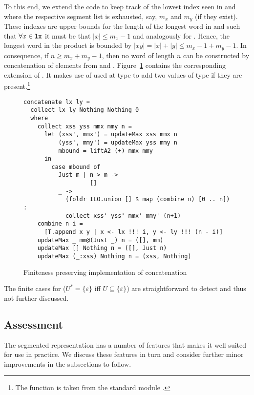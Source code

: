 To this end, we extend the code to keep track of the lowest index
seen in  and  where the respective segment list is
exhausted, say, $m_x$ and $m_y$ (if they exist). These indexes
are upper bounds for the length of the longest word in  and
 such that $\forall x \in \code{lx}$ it must be that
$|x|\le m_x-1$ and analogously for . Hence, the longest word in
the product is bounded by $|xy| = |x| + |y| \le m_x -1 + m_y -1$. In
consequence, if $n \ge m_x + m_y - 1$, then no word of
length $n$ can be constructed by concatenation of elements from
 and
. Figure~\ref{fig:finite-concatenation-segmented} contains
the corresponding extension of . It makes use of
 used at type  to add two values of type  if they are present.\footnote{The function  is taken from
the standard module .}
\begin{figure}[tp]
\begin{lstlisting}
concatenate lx ly =
  collect lx ly Nothing Nothing 0
  where
    collect xss yss mmx mmy n =
      let (xss', mmx') = updateMax xss mmx n
          (yss', mmy') = updateMax yss mmy n
          mbound = liftA2 (+) mmx mmy
      in
        case mbound of
          Just m | n > m ->
                   []
          _ ->
            (foldr ILO.union [] $ map (combine n) [0 .. n]) :
            collect xss' yss' mmx' mmy' (n+1)
    combine n i =
      [T.append x y | x <- lx !!! i, y <- ly !!! (n - i)]
    updateMax _ mm@(Just _) n = ([], mm)
    updateMax [] Nothing n = ([], Just n)
    updateMax (_:xss) Nothing n = (xss, Nothing)
\end{lstlisting}
  \caption{Finiteness preserving implementation of concatenation}
  \label{fig:finite-concatenation-segmented}
\end{figure}

The finite cases for  ($U^* = \{\varepsilon\}$ iff
$U\subseteq\{\varepsilon\}$) are straightforward to detect and thus not further discussed.

\subsection{Assessment}
\label{sec:interm-assessm}

The segmented representation has a number of features that makes it
well suited for use in practice. We discuss these features in turn and
consider further minor improvements in the subsections to follow.

